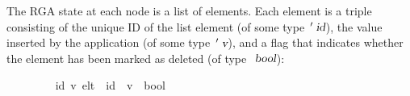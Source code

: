 The RGA state at each node is a list of elements.
Each element is a triple consisting of the unique ID of the list element (of some type $\isacharprime\isa{id}$), the value inserted by the application (of some type $\isacharprime\isa{v}$), and a flag that indicates whether the element has been marked as deleted (of type $\isa{bool}$):
\vspace{0.275em}
\begin{isabellebody}
\ \ \ \ \ \ \ \  {\isacharparenleft}{\isacharprime}id{\isacharcomma}\ {\isacharprime}v{\isacharparenright}\ elt\ {\isacharequal}\ {\isachardoublequoteopen}{\isacharprime}id\ {\isasymtimes}\ {\isacharprime}v\ {\isasymtimes}\ bool{\isachardoublequoteclose}%
\end{isabellebody}
\vspace{0.275em}

